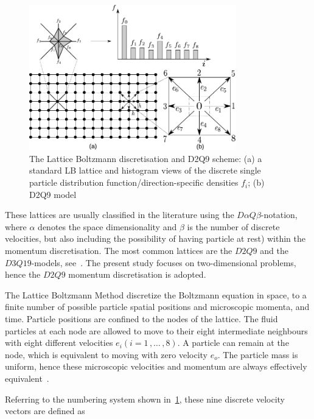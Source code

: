 \begin{figure}[htpb]
	\centering
	\includegraphics[width=0.8\textwidth]{D2Q9}
	\caption[The Lattice Boltzmann discretisation and D2Q9 scheme]{The Lattice 
	Boltzmann discretisation and D2Q9 scheme: (a) a standard LB lattice and 
	histogram views of the discrete single particle distribution 
	function/direction-specific densities $f_i$; (b) D2Q9 model}
	\label{fig:D2Q9}
\end{figure}

These lattices are usually classified in the literature using the 
$\mathit{D}\alpha\mathit{Q}\beta$-notation, where $\alpha$ denotes the space 
dimensionality and $\beta$ is the number of discrete velocities, but also 
including the possibility of having particle at rest) within the momentum 
discretisation. The most common lattices are the $\mathit{D2Q9}$ and the 
$\mathit{D3Q19}$-models, see~\citet{He1997}. The present study focuses on 
two-dimensional problems, hence the $\mathit{D2Q9}$ momentum discretisation is 
adopted.

The Lattice Boltzmann Method discretize the Boltzmann equation in space, to a 
finite number of possible particle spatial positions and microscopic momenta, 
and time. Particle positions are confined to the nodes of the lattice. The 
fluid particles at each node are allowed to move to their eight intermediate 
neighbours with eight different velocities $\mathit{e_i} 
(\mathit{i}=1\,,\dots\,,8)$. A particle can remain at the node, which is 
equivalent to moving with zero velocity $\mathit{e_o}$. The particle mass is 
uniform, hence these microscopic velocities and momentum are always effectively 
equivalent~\citep{Han2007}.

Referring to the numbering system shown in~\cref{fig:D2Q9}, these nine 
discrete velocity vectors are defined as

